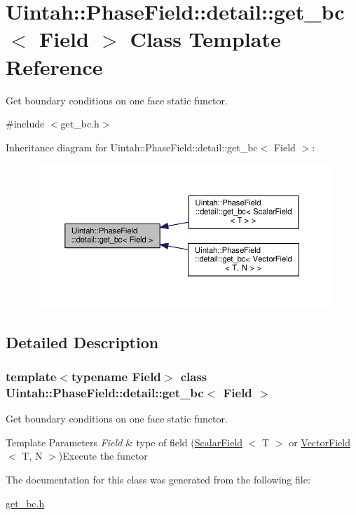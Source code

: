 \hypertarget{classUintah_1_1PhaseField_1_1detail_1_1get__bc}{}\section{Uintah\+:\+:Phase\+Field\+:\+:detail\+:\+:get\+\_\+bc$<$ Field $>$ Class Template Reference}
\label{classUintah_1_1PhaseField_1_1detail_1_1get__bc}


Get boundary conditions on one face static functor.  




{\ttfamily \#include $<$get\+\_\+bc.\+h$>$}



Inheritance diagram for Uintah\+:\+:Phase\+Field\+:\+:detail\+:\+:get\+\_\+bc$<$ Field $>$\+:\nopagebreak
\begin{figure}[H]
\begin{center}
\leavevmode
\includegraphics[width=350pt]{classUintah_1_1PhaseField_1_1detail_1_1get__bc__inherit__graph}
\end{center}
\end{figure}


\subsection{Detailed Description}
\subsubsection*{template$<$typename Field$>$\newline
class Uintah\+::\+Phase\+Field\+::detail\+::get\+\_\+bc$<$ Field $>$}

Get boundary conditions on one face static functor. 


\begin{DoxyTemplParams}{Template Parameters}
{\em Field} & type of field (\hyperlink{structUintah_1_1PhaseField_1_1ScalarField}{Scalar\+Field} $<$ T $>$ or \hyperlink{structUintah_1_1PhaseField_1_1VectorField}{Vector\+Field} $<$ T, N $>$)Execute the functor \\
\hline
\end{DoxyTemplParams}


The documentation for this class was generated from the following file\+:\begin{DoxyCompactItemize}
\item 
\hyperlink{get__bc_8h}{get\+\_\+bc.\+h}\end{DoxyCompactItemize}
